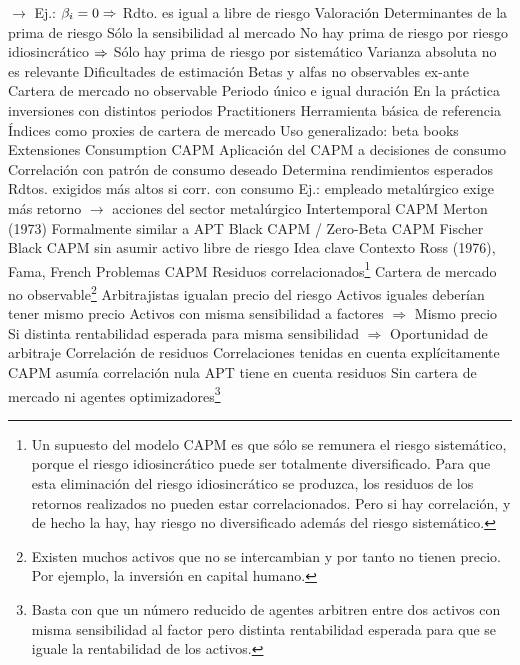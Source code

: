 \documentclass{nuevotema}
\begin{document}
\begin{esquemal}
				\4[] $\to$ Ej.: $\beta_i=0 \Rightarrow$ Rdto. es igual a libre de riesgo
				\4[] 
		\2 Valoración
			\3 Determinantes de la prima de riesgo
				\4 Sólo la sensibilidad al mercado
				\4 No hay prima de riesgo por riesgo idiosincrático
				\4[] $\Rightarrow$ Sólo hay prima de riesgo por sistemático
				\4 Varianza absoluta no es relevante
			\3 Dificultades de estimación
				\4 Betas y alfas no observables ex-ante
				\4 Cartera de mercado no observable
			\3 Periodo único e igual duración
				\4 En la práctica inversiones con distintos periodos
			\3 Practitioners
				\4 Herramienta básica de referencia
				\4 Índices como proxies de cartera de mercado
				\4 Uso generalizado: beta books
		\2 Extensiones
			\3 Consumption CAPM
				\4 Aplicación del CAPM a decisiones de consumo
				\4 Correlación con patrón de consumo deseado
				\4[] Determina rendimientos esperados
				\4[$\Rightarrow$] Rdtos. exigidos más altos si corr. con consumo
				\4[] Ej.:
				\4[] empleado metalúrgico exige más retorno
				\4[] $\to$ acciones del sector metalúrgico
			\3 Intertemporal CAPM
				\4 Merton (1973)
				\4 Formalmente similar a APT
			\3 Black CAPM / Zero-Beta CAPM
				\4 Fischer Black
				\4 CAPM sin asumir activo libre de riesgo
	\1 
		\2 Idea clave
			\3 Contexto
				\4 Ross (1976), Fama, French
			\3 Problemas CAPM
				\4 Residuos correlacionados\footnote{Un supuesto del modelo CAPM es que sólo se remunera el riesgo sistemático, porque el riesgo idiosincrático puede ser totalmente diversificado. Para que esta eliminación del riesgo idiosincrático se produzca, los residuos de los retornos realizados no pueden estar correlacionados. Pero si hay correlación, y de hecho la hay, hay riesgo no diversificado además del riesgo sistemático.}
				\4 Cartera de mercado no observable\footnote{Existen muchos activos que no se intercambian y por tanto no tienen precio. Por ejemplo, la inversión en capital humano. }
			\3 Arbitrajistas igualan precio del riesgo
				\4 Activos iguales deberían tener mismo precio
				\4 Activos con misma sensibilidad a factores
				\4[] $\Rightarrow$ Mismo precio
				\4[] Si distinta rentabilidad esperada para misma sensibilidad
				\4[] $\Rightarrow$ Oportunidad de arbitraje
			\3 Correlación de residuos
				\4 Correlaciones tenidas en cuenta explícitamente
				\4[] CAPM asumía correlación nula
				\4 APT tiene en cuenta residuos
			\3 Sin cartera de mercado ni agentes optimizadores\footnote{Basta con que un número reducido de agentes arbitren entre dos activos con misma sensibilidad al factor pero distinta rentabilidad esperada para que se iguale la rentabilidad de los activos.}

\end{esquemal}
\end{document}
